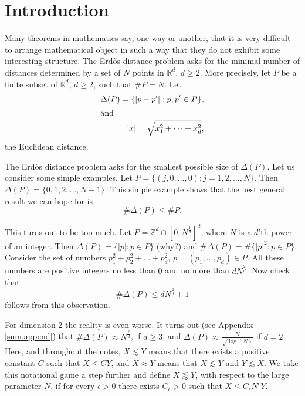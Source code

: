 \documentclass[]{stml-l}
\numberwithin{equation}{chapter}
\theoremstyle{plain}
\theoremstyle{definition}
\theoremstyle{remark}
\begin{document}
\mainmatter

\chapter*{Introduction}

Many theorems in mathematics say, one way or another, that it is
very difficult to arrange mathematical object in such a way that
they do not exhibit some interesting structure. The Erd\H{o}s distance
problem asks for the minimal number of distances determined by a
set  of $N$ points in $\mathbb{R}^d$, $d \ge 2$. More precisely, let
$P$ be a finite subset of $ \mathbb{R}^d$, $d \ge 2$, such that $\#
P=N$. Let
\begin{align}
 \Delta(P)=\{|p-p'|: p,p' \in P\},
\\
\intertext{and}
 |x|=\sqrt{x_1^2+\dots+x_d^2},
\end{align}
 the Euclidean distance.

The Erd\H{o}s distance problem asks for the smallest possible size
of $\Delta(P)$. Let us consider some simple examples. Let
$P=\{(j,0, \dots, 0): j=1,2, \dots, N\}$. Then $\Delta(P)=\{0,1,2,
\dots, N-1\}$. This simple example shows that the best general
result we can hope for is
\begin{equation}
\# \Delta(P) \leq \# P. \end{equation}



This turns out to be too much. Let $P=\mathbb{Z}^d \cap {[0,
N^{\frac{1}{d}}]}^d$, where $N$ is a $d$'th power of an integer.
Then $\Delta(P)=\{|p|: p \in P\}$ (why?) and $\# \Delta(P)=\#
\{{|p|}^2: p \in P\}$. Consider the set of numbers
$p_1^2+p_2^2+\dots+p_d^2$, $p=(p_1, \dots, p_d) \in P$. All these
numbers are positive integers no less than $0$ and no more than
$dN^{\frac{2}{d}}$. Now check that
\begin{equation}
\# \Delta(P) \leq dN^{\frac{2}{d}}+1
\end{equation} follows from this observation.



For dimension 2 the reality is even worse. It turns out (see
Appendix \ref{sum.append}) that $\# \Delta(P) \approx N^{\frac{2}{d}}$, if $d
\geq 3$, and $\Delta(P) \approx \frac{N}{\sqrt{\log(N)}}$ if
$d=2$. Here, and throughout the notes, $X \lesssim Y$ means that
there exists a positive constant $C$ such that $X \leq CY$, and $X
\approx Y$ means that $X \lesssim Y$ and $Y \lesssim X$. We take
this notational game a step further and define $X \lessapprox Y$,
with respect to the large parameter $N$, if for every $\epsilon>0$
there exists $C_{\epsilon}>0$ such that $X \leq
C_{\epsilon}N^{\epsilon}Y$.
\end{document}
